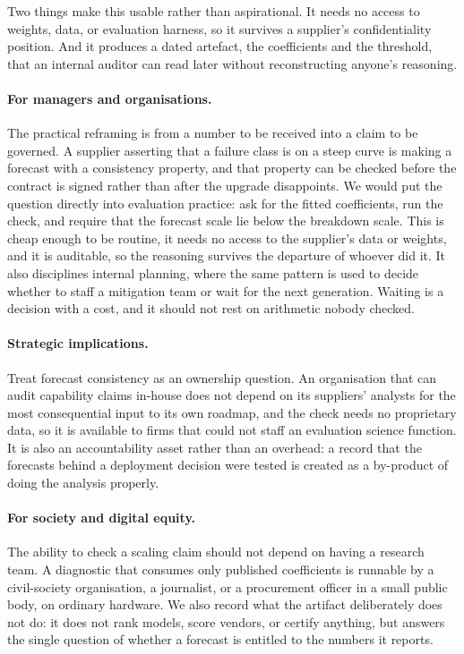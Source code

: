 \documentclass[11pt]{article}
\begin{document}
Two things make this usable rather than aspirational. It needs no access to weights,
data, or evaluation harness, so it survives a supplier's confidentiality position.
And it produces a dated artefact, the coefficients and the threshold, that an
internal auditor can read later without reconstructing anyone's reasoning.

\paragraph{For managers and organisations.}
The practical reframing is from a number to be received into a claim to be governed.
A supplier asserting that a failure class is on a steep curve is making a forecast
with a consistency property, and that property can be checked before the contract
is signed rather than after the upgrade disappoints. We would put the question
directly into evaluation practice: ask for the fitted coefficients, run the check,
and require that the forecast scale lie below the breakdown scale. This is cheap
enough to be routine, it needs no access to the supplier's data or weights, and it
is auditable, so the reasoning survives the departure of whoever did it. It also
disciplines internal planning, where the same pattern is used to decide whether to
staff a mitigation team or wait for the next generation. Waiting is a decision with
a cost, and it should not rest on arithmetic nobody checked.

\paragraph{Strategic implications.}
Treat forecast consistency as an ownership question. An organisation that can audit
capability claims in-house does not depend on its suppliers' analysts for the most
consequential input to its own roadmap, and the check needs no proprietary data, so
it is available to firms that could not staff an evaluation science function. It is
also an accountability asset rather than an overhead: a record that the forecasts
behind a deployment decision were tested is created as a by-product of doing the
analysis properly.

\paragraph{For society and digital equity.}
The ability to check a scaling claim should not depend on having a research team. A
diagnostic that consumes only published coefficients is runnable by a civil-society
organisation, a journalist, or a procurement officer in a small public body, on
ordinary hardware. We also record what the artifact deliberately does not do: it
does not rank models, score vendors, or certify anything, but answers the single
question of whether a forecast is entitled to the numbers it reports.
\end{document}
